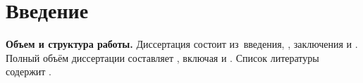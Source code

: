 \chapter*{Введение}                         %

\newcommand{\actuality}{}
\newcommand{\progress}{\textbf{\progressTXT}}
\newcommand{\objectresearch}{\textbf{\objectresearchTXT}}
\newcommand{\subjectresearch}{\textbf{\subjectresearchTXT}}
\newcommand{\aim}{\textbf{\aimTXT}}
\newcommand{\tasks}{\textbf{\tasksTXT}}
\newcommand{\novelty}{\textbf{\noveltyTXT}}
\newcommand{\fieldresearch}{\textbf{\fieldresearchTXT}}
\newcommand{\influence}{\textbf{\influenceTXT}}
\newcommand{\elaboration}{\textbf{\elaborationTXT}}
\newcommand{\methods}{\textbf{\methodsTXT}}
\newcommand{\defpositions}{\textbf{\defpositionsTXT}}

\newcommand{\reliability}{\textbf{\reliabilityTXT}}
\newcommand{\probation}{\textbf{\probationTXT}}
\newcommand{\contribution}{\textbf{\contributionTXT}}
\newcommand{\publications}{\textbf{\publicationsTXT}}


\textbf{Объем и структура работы.} Диссертация состоит из~введения,
,
заключения и
.
%
Полный объём диссертации составляет
, включая
 и
.
Список литературы содержит
.